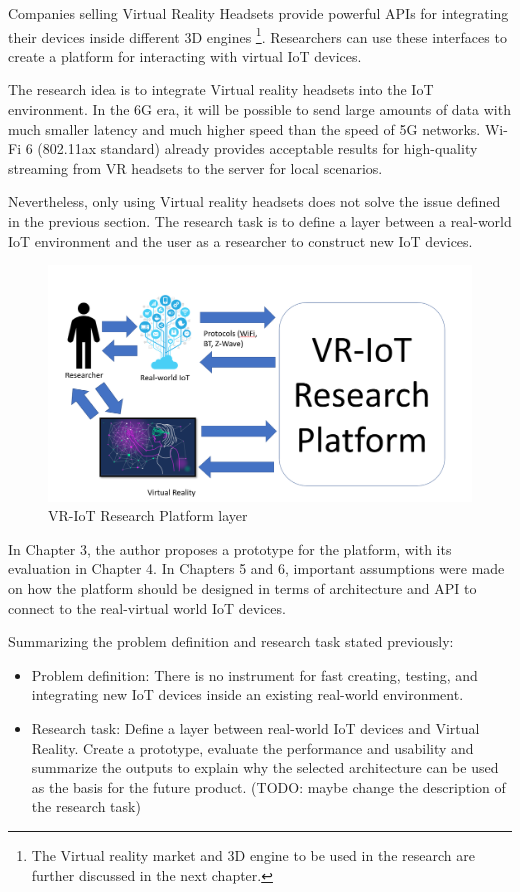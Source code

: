 Companies selling Virtual Reality Headsets provide powerful APIs for integrating their devices inside different 3D engines \footnote{The Virtual reality market and 3D engine to be used in the research are further discussed in the next chapter.}. Researchers can use these interfaces to create a platform for interacting with virtual IoT devices.

The research idea is to integrate Virtual reality headsets into the IoT environment. In the 6G era, it will be possible to send large amounts of data with much smaller latency and much higher speed than the speed of 5G networks. Wi-Fi 6 (802.11ax standard) already provides acceptable results for high-quality streaming from VR headsets to the server for local scenarios.

Nevertheless, only using Virtual reality headsets does not solve the issue defined in the previous section. The research task is to define a layer between a real-world IoT environment and the user as a researcher to construct new IoT devices. 

\begin{figure}
  \centering
  \includegraphics[width=0.9\linewidth]{figures/VR-IoTResearchPlatformLayer.png}
  \caption{VR-IoT Research Platform layer}
  \label{fig:VR-IoTResearchPlatformLayer-figure}
\end{figure}

In Chapter 3, the author proposes a prototype for the platform, with its evaluation in Chapter 4. In Chapters 5 and 6, important assumptions were made on how the platform should be designed in terms of architecture and API to connect to the real-virtual world IoT devices.

Summarizing the problem definition and research task stated previously:

\begin{itemize}
    \item Problem definition: There is no instrument for fast creating, testing, and integrating new IoT devices inside an existing real-world environment.
    \item Research task: Define a layer between real-world IoT devices and Virtual Reality. Create a prototype, evaluate the performance and usability and summarize the outputs to explain why the selected architecture can be used as the basis for the future product. (TODO: maybe change the description of the research task)
\end{itemize}